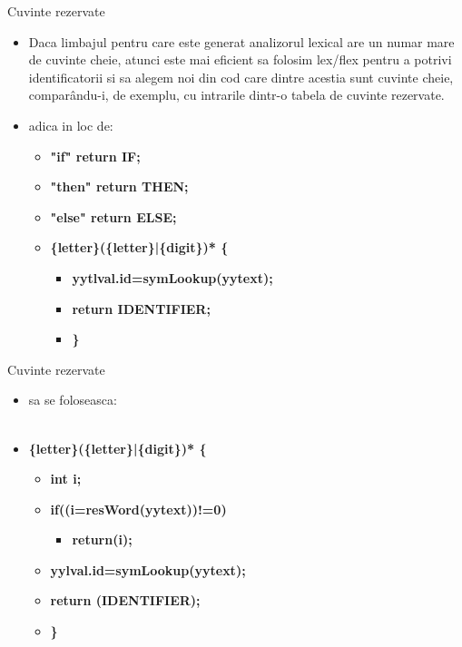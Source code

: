 \documentclass[pdf]{beamer}
\begin{document}
\begin{frame}{Cuvinte rezervate}
\begin{itemize}
\item
Daca limbajul pentru care este generat analizorul lexical are un numar mare de cuvinte cheie, atunci este mai eficient sa folosim lex/flex pentru a potrivi identificatorii si sa alegem noi din cod care dintre acestia sunt cuvinte cheie, comparându-i, de exemplu, cu intrarile dintr-o tabela de cuvinte rezervate.
\newline

\item
adica in loc de:
\begin{itemize}
    \item[]
    \textbf{"if" \hspace{35mm} return IF;}
    \item[] 
    \textbf{"then" \hspace{20mm} return THEN;}
    \item[] 
    \textbf{"else" \hspace{24mm} return ELSE;}
    \item[] 
    \textbf{\{letter\}(\{letter\}|\{digit\})* \{ }
    \begin{itemize}
        \item 
        \textbf{yytlval.id=symLookup(yytext);}
        \item
        \textbf{return IDENTIFIER;}
        \item
        \textbf{\}}
    \end{itemize}
\end{itemize}
\end{itemize}
\end{frame}


\begin{frame}{Cuvinte rezervate}
\begin{itemize}
\item
sa se foloseasca: \\~\\
\item[] 
\textbf{\{letter\}(\{letter\}|\{digit\})* \{ }
\begin{itemize}
    \item[] 
    \textbf{int i;}
    \item[]
    \textbf{if((i=resWord(yytext))!=0)}
    \begin{itemize}
        \item[] 
        \textbf{return(i);}
    \end{itemize}
    \item[]
    \textbf{yylval.id=symLookup(yytext);}
    \item[]
    \textbf{return (IDENTIFIER);}
    \item[]
    \textbf{\}}
\end{itemize}

\end{itemize}
\end{frame}
\end{document}
